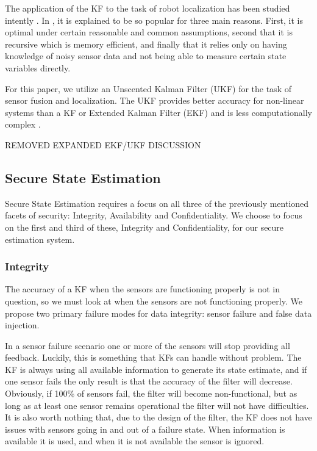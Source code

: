 \documentclass[conference]{IEEEtran}
\begin{document}
The application of the KF to the task of robot localization has been studied intently \cite{Localization2003, Mohsin2014}. In \cite{Mohsin2014}, it is explained to be so popular for three main reasons. First, it is optimal under certain reasonable and common assumptions, second that it is recursive which is memory efficient, and finally that it relies only on having knowledge of noisy sensor data and not being able to measure certain state variables directly.

For this paper, we utilize an Unscented Kalman Filter (UKF) for the task of sensor fusion and localization. The UKF provides better accuracy for non-linear systems than a KF or Extended Kalman Filter (EKF) and is less computationally complex \cite{Julier1997}.

REMOVED EXPANDED EKF/UKF DISCUSSION

\subsection{Secure State Estimation}
Secure State Estimation requires a focus on all three of the previously mentioned facets of security: Integrity, Availability and Confidentiality. We choose to focus on the first and third of these, Integrity and Confidentiality, for our secure estimation system.

\subsubsection{Integrity}
The accuracy of a KF when the sensors are functioning properly is not in question, so we must look at when the sensors are not functioning properly. We propose two primary failure modes for data integrity: sensor failure and false data injection.

In a sensor failure scenario one or more of the sensors will stop providing all feedback. Luckily, this is something that KFs can handle without problem. The KF is always using all available information to generate its state estimate, and if one sensor fails the only result is that the accuracy of the filter will decrease. Obviously, if 100\% of sensors fail, the filter will become non-functional, but as long as at least one sensor remains operational the filter will not have difficulties. It is also worth nothing that, due to the design of the filter, the KF does not have issues with sensors going in and out of a failure state. When information is available it is used, and when it is not available the sensor is ignored.
\end{document}
